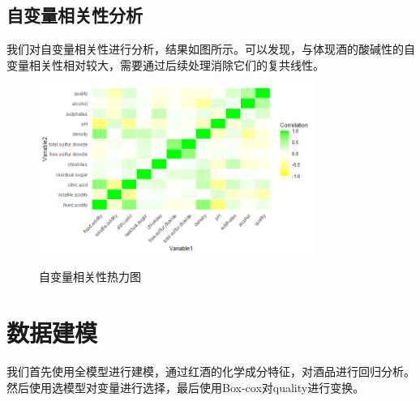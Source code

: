 \documentclass[fontset=ubuntu]{ctexart}
\begin{document}
        \subsection{自变量相关性分析}
            我们对自变量相关性进行分析，结果如图所示。可以发现，与体现酒的酸碱性的自变量相关性相对较大，需要通过后续处理消除它们的复共线性。
            \begin{figure}[htbp]
                \centering
                \includegraphics[width=0.8\textwidth]{../figures/covariance.png}
                \label{fig:covariance}
                \caption{自变量相关性热力图}
            \end{figure}
    \section{数据建模}
        我们首先使用全模型进行建模，通过红酒的化学成分特征，对酒品进行回归分析。然后使用选模型对变量进行选择，最后使用Box-cox对quality进行变换。
        \clearpage
\end{document}
